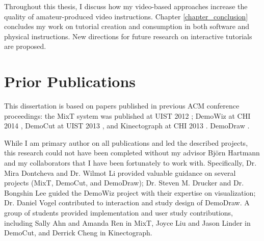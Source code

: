 Throughout this thesis, I discuss how my video-based approaches increase the quality of amateur-produced video instructions. Chapter \ref{chapter_conclusion} concludes my work on tutorial creation and consumption in both software and physical instructions. New directions for future research on interactive tutorials are proposed.


\section {Prior Publications}

This dissertation is based on papers published in previous ACM conference proceedings: the MixT system was published at UIST 2012 \cite{Chi:2012:MAG:2380116.2380130}; DemoWiz at CHI 2014 \cite{Chi:2014:DRS:2556288.2557254}, DemoCut at UIST 2013 \cite{Chi:2013:DGC:2501988.2502052}, and Kinectograph at CHI 2013 \cite{Cheng:2013:BCC:2468356.2468568}. DemoDraw .

While I am primary author on all publications and led the described projects, this research could not have been completed without my advisor Bj\"orn Hartmann and my collaborators that I have been fortunately to work with. Specifically, Dr. Mira Dontcheva and Dr. Wilmot Li provided valuable guidance on several projects (MixT, DemoCut, and DemoDraw); Dr. Steven M. Drucker and Dr. Bongshin Lee guided the DemoWiz project with their expertise on visualization; Dr. Daniel Vogel contributed to interaction and study design of DemoDraw. A group of students provided implementation and user study contributions, including Sally Ahn and Amanda Ren in MixT, Joyce Liu and Jason Linder in DemoCut, and Derrick Cheng in Kinectograph.

